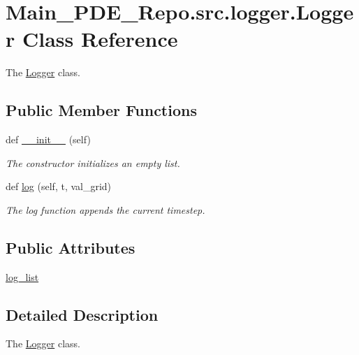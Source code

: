 \hypertarget{classMain__PDE__Repo_1_1src_1_1logger_1_1Logger}{}\section{Main\+\_\+\+P\+D\+E\+\_\+\+Repo.\+src.\+logger.\+Logger Class Reference}
\label{classMain__PDE__Repo_1_1src_1_1logger_1_1Logger}


The \hyperlink{classMain__PDE__Repo_1_1src_1_1logger_1_1Logger}{Logger} class.  


\subsection*{Public Member Functions}
\begin{DoxyCompactItemize}
\item 
def \hyperlink{classMain__PDE__Repo_1_1src_1_1logger_1_1Logger_a1cb1b576ea43629aba66f291b97099e2}{\+\_\+\+\_\+init\+\_\+\+\_\+} (self)
\begin{DoxyCompactList}\small\item\em The constructor initializes an empty list. \end{DoxyCompactList}\item 
def \hyperlink{classMain__PDE__Repo_1_1src_1_1logger_1_1Logger_a5028b1f1929f7124fc5322aaa917f118}{log} (self, t, val\+\_\+grid)
\begin{DoxyCompactList}\small\item\em The log function appends the current timestep. \end{DoxyCompactList}\end{DoxyCompactItemize}
\subsection*{Public Attributes}
\begin{DoxyCompactItemize}
\item 
\hyperlink{classMain__PDE__Repo_1_1src_1_1logger_1_1Logger_a159655c83565fd1bfbbabb470ea7da0f}{log\+\_\+list}
\end{DoxyCompactItemize}


\subsection{Detailed Description}
The \hyperlink{classMain__PDE__Repo_1_1src_1_1logger_1_1Logger}{Logger} class. 

